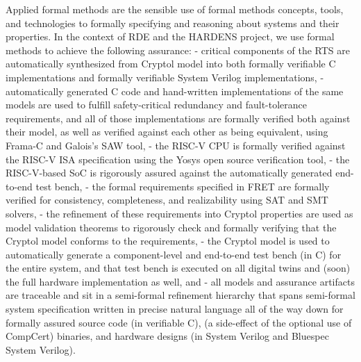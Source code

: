 \documentclass[11pt]{article}
\begin{document}
Applied formal methods are the sensible use of formal methods concepts,
tools, and technologies to formally specifying and reasoning about
systems and their properties. In the context of RDE and the HARDENS
project, we use formal methods to achieve the following assurance: -
critical components of the RTS are automatically synthesized from
Cryptol model into both formally verifiable C implementations and
formally verifiable System Verilog implementations, - automatically
generated C code and hand-written implementations of the same models are
used to fulfill safety-critical redundancy and fault-tolerance
requirements, and all of those implementations are formally verified
both against their model, as well as verified against each other as
being equivalent, using Frama-C and Galois's SAW tool, - the RISC-V CPU
is formally verified against the RISC-V ISA specification using the
Yosys open source verification tool, - the RISC-V-based SoC is
rigorously assured against the automatically generated end-to-end test
bench, - the formal requirements specified in FRET are formally verified
for consistency, completeness, and realizability using SAT and SMT
solvers, - the refinement of these requirements into Cryptol properties
are used as model validation theorems to rigorously check and formally
verifying that the Cryptol model conforms to the requirements, - the
Cryptol model is used to automatically generate a component-level and
end-to-end test bench (in C) for the entire system, and that test bench
is executed on all digital twins and (soon) the full hardware
implementation as well, and - all models and assurance artifacts are
traceable and sit in a semi-formal refinement hierarchy that spans
semi-formal system specification written in precise natural language all
of the way down for formally assured source code (in verifiable C), (a
side-effect of the optional use of CompCert) binaries, and hardware
designs (in System Verilog and Bluespec System Verilog).
\end{document}
